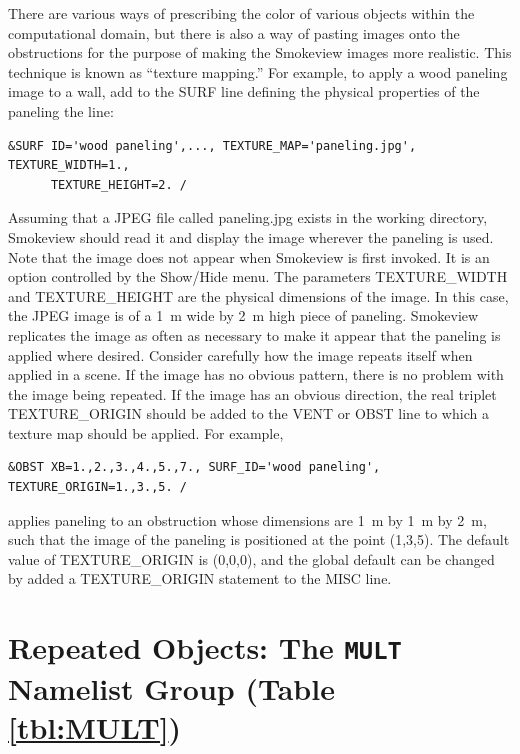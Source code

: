 \documentclass[11pt]{book}
\begin{document}
There are various ways of prescribing the color of various objects
within the computational domain, but there is also a way of pasting
images onto the obstructions for the purpose of making the Smokeview
images more realistic. This technique is known as ``texture mapping.''
For example, to apply a wood paneling image to a wall,
add to the {\ct SURF} line defining the physical properties of the
paneling the line:
\begin{lstlisting}
&SURF ID='wood paneling',..., TEXTURE_MAP='paneling.jpg', TEXTURE_WIDTH=1.,
      TEXTURE_HEIGHT=2. /
\end{lstlisting}
Assuming that a JPEG file called {\ct paneling.jpg} exists in the
working directory, Smokeview should read it and display the image
wherever the paneling is used.
Note that the image does not appear when Smokeview is first invoked. It is an option controlled by
the {\ct Show/Hide} menu. The parameters {\ct TEXTURE\_WIDTH}
and {\ct TEXTURE\_HEIGHT} are the physical dimensions of the image. In this case,
the JPEG image is of a 1~m wide by 2~m high piece of
paneling. Smokeview replicates the image as often as necessary to
make it appear that the paneling is applied where desired.
Consider carefully how the image repeats itself when
applied in a scene. If the image has no obvious pattern, there is no
problem with the image being repeated. If the image has an obvious
direction, the real triplet {\ct TEXTURE\_ORIGIN} should be added to
the {\ct VENT} or {\ct OBST} line to which a texture map
should be applied. For example,

\begin{lstlisting}
&OBST XB=1.,2.,3.,4.,5.,7., SURF_ID='wood paneling', TEXTURE_ORIGIN=1.,3.,5. /
\end{lstlisting}
applies paneling to an obstruction whose dimensions are 1~m by 1~m by 2~m, such that the image of the paneling is positioned at the point (1,3,5). The default value of {\ct TEXTURE\_ORIGIN} is (0,0,0), and the global default can be changed by added a {\ct TEXTURE\_ORIGIN} statement to the {\ct MISC} line.




\section{Repeated Objects: The \texorpdfstring{{\tt MULT}}{MULT} Namelist Group (Table \ref{tbl:MULT})}
\label{info:MULT}
\end{document}
